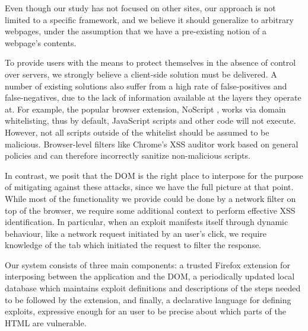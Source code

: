  Even though our study has not focused on other sites, our approach is not limited to a specific framework, and we believe it should generalize to arbitrary webpages, under the assumption that we have a pre-existing notion of a webpage's contents.

To provide users with the means to protect themselves in the absence of control over servers, we strongly believe a client-side solution must be delivered. A number of existing solutions also suffer from a high rate of false-positives and false-negatives, due to the lack of information available at the layers they operate at. For example, the popular browser extension, NoScript \cite{Noscript}, works via domain whitelisting, thus by default, JavaScript scripts and other code will not execute. However, not all scripts outside of the whitelist should be assumed to be malicious. Browser-level filters like Chrome's XSS auditor \cite{xssauditor} work based on general policies and can therefore incorrectly sanitize non-malicious scripts.

In contrast, we posit that the DOM is the right place to interpose for the purpose of mitigating against these attacks, since we have the full picture at that point. While most of the functionality we provide could be done by a network filter on top of the browser, we require some additional context to perform effective XSS identification. In particular, when an exploit manifests itself through dynamic behaviour, like a network request initiated by an user's click, we require knowledge of the tab which initiated the request to filter the response.

 Our system consists of three main components: a trusted Firefox extension for interposing between the application and the DOM, a periodically updated local database which maintains exploit definitions and descriptions of the steps needed to be followed by the extension, and finally, a declarative language for defining exploits, expressive enough for an user to be precise about which parts of the HTML are vulnerable. 


